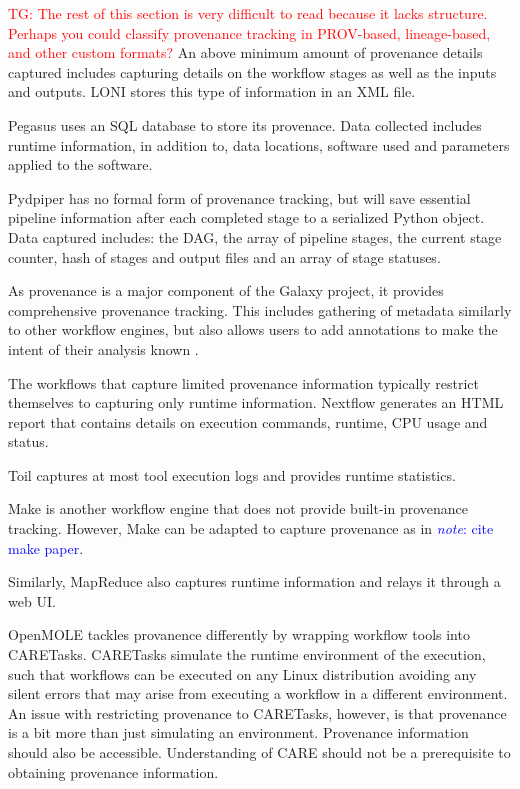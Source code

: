 \documentclass{report}
\newcommand{\note}[1]{\textcolor{blue}{\textit{note}: #1}}
\newcommand{\tristan}[1]{\textcolor{red}{TG: #1}}
\begin{document}
            \tristan{The rest of this section is very difficult to read because
            it lacks structure. Perhaps you could classify provenance tracking in PROV-based, lineage-based,
            and other custom formats?}
            An above minimum amount of provenance details captured includes 
            capturing details on the workflow stages as well as the inputs and
            outputs. LONI stores this type of information in an XML file.

            Pegasus uses an SQL database to store its provenace. Data collected 
            includes runtime information,
            in addition to, data locations, software used and parameters 
            applied to the software.

            Pydpiper has no formal form of provenance tracking, but will save 
            essential pipeline information after each completed stage to a 
            serialized Python object. Data captured includes: the DAG, the 
            array of pipeline stages, the current stage counter, hash of stages 
            and output files and an array of stage statuses.


            As provenance is a major component of the Galaxy project, it 
            provides comprehensive provenance tracking. This includes gathering
            of metadata similarly to other workflow engines, but also allows
            users to add annotations to make the intent of their analysis known
            .

            The workflows that capture limited provenance information typically
            restrict themselves to capturing only runtime information.
            Nextflow generates an
            HTML report that contains details on execution commands, runtime, 
            CPU usage and status.

            Toil captures at most tool execution logs and provides runtime 
            statistics.

            Make is another workflow engine that does not provide built-in 
            provenance tracking. However, Make can be adapted to capture 
            provenance as in \note{cite make paper}.

            Similarly, MapReduce also captures runtime information and relays 
            it through a web UI.

            OpenMOLE tackles provanence differently by wrapping workflow tools
            into CARETasks. CARETasks simulate the runtime environment of the 
            execution, such that workflows can be executed on any Linux 
            distribution avoiding any silent errors that may arise from 
            executing a workflow in a different environment. An issue with 
            restricting provenance to CARETasks, however, is that provenance is
            a bit more than just simulating an environment. Provenance 
            information should also be accessible. Understanding of CARE should
            not be a prerequisite to obtaining provenance information.
                     
\end{document}
